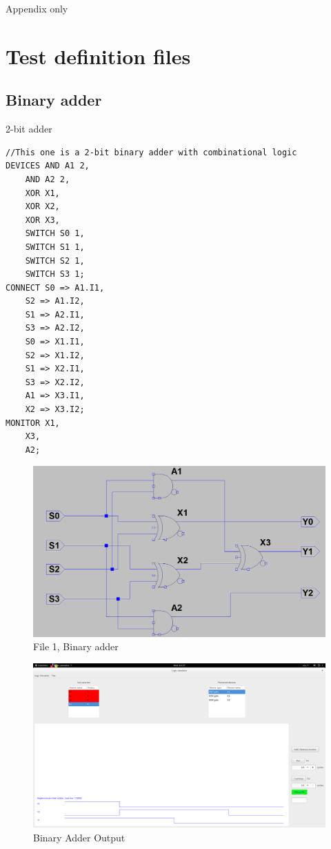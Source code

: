 \documentclass[12pt]{article}
\begin{document}
Appendix only

\appendix
\section{Test definition files}
\subsection{Binary adder}
2-bit adder\\
\begin{verbatim}
//This one is a 2-bit binary adder with combinational logic
DEVICES	AND A1 2,
	AND A2 2,
	XOR X1,
	XOR X2,
	XOR X3,
	SWITCH S0 1,
	SWITCH S1 1,
	SWITCH S2 1,
	SWITCH S3 1;
CONNECT	S0 => A1.I1,
	S2 => A1.I2,
	S1 => A2.I1,
	S3 => A2.I2,
	S0 => X1.I1,
	S2 => X1.I2,
	S1 => X2.I1,
	S3 => X2.I2,
	A1 => X3.I1,
	X2 => X3.I2;
MONITOR	X1,
	X3,
	A2;
\end{verbatim}

\begin{figure}[H]
  \centering
  \includegraphics[width=0.9\linewidth]{figures/Test101.png}
  \captionsetup{width=.7\linewidth}
  \caption{File 1, Binary adder}
  \label{fig:1}
\end{figure}
\begin{figure}[H]
	\centering
	\includegraphics[width=0.9\linewidth]{figures/101_OUTPUT.png}
	\captionsetup{width=.7\linewidth}
	\caption{Binary Adder Output}
	\label{fig:2}
\end{figure}
\end{document}
